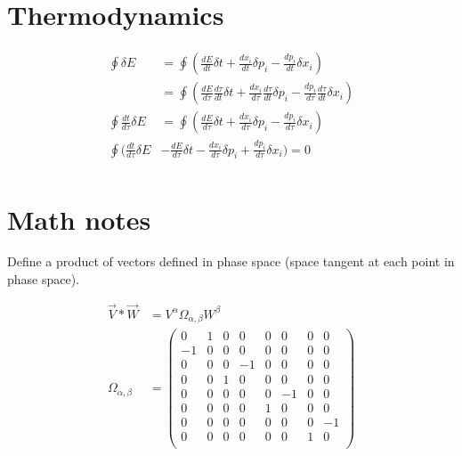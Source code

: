 \documentclass[twocolumn,floatfix,nofootinbib]{revtex4}   %
\theoremstyle{theorem}
\theoremstyle{definition}
\begin{document}
\section{Thermodynamics}
\begin{align*}
\oint \delta E &= \oint (\frac{dE}{dt} \delta t + \frac{dx_i}{dt} \delta p_i - \frac{dp_i}{dt} \delta x_i) \\
 &= \oint (\frac{dE}{d\tau} \frac{d\tau}{dt} \delta t + \frac{dx_i}{d\tau}\frac{d\tau}{dt} \delta p_i - \frac{dp_i}{d\tau}\frac{d\tau}{dt} \delta x_i) \\
\oint \frac{dt}{d\tau} \delta E &= \oint (\frac{dE}{d\tau} \delta t + \frac{dx_i}{d\tau} \delta p_i - \frac{dp_i}{d\tau} \delta x_i) \\
\oint (\frac{dt}{d\tau} \delta E &- \frac{dE}{d\tau} \delta t - \frac{dx_i}{d\tau} \delta p_i + \frac{dp_i}{d\tau} \delta x_i) = 0 \\
\end{align*}


\section{Math notes}

Define a product of vectors defined in phase space (space tangent at each point in phase space).

\begin{align*}
\vec{V} \ast \vec{W} &= V^{\alpha} \Omega_{\alpha, \beta} W^{\beta} \\
\Omega_{\alpha, \beta} &= \left(
                      \begin{array}{cccccccc}
                        0 & 1 & 0 & 0 & 0 & 0 & 0 & 0 \\
                        -1 & 0 & 0 & 0 & 0 & 0 & 0 & 0 \\
                        0 & 0 & 0 & -1 & 0 & 0 & 0 & 0 \\
                        0 & 0 & 1 & 0 & 0 & 0 & 0 & 0 \\
                        0 & 0 & 0 & 0 & 0 & -1 & 0 & 0 \\
                        0 & 0 & 0 & 0 & 1 & 0 & 0 & 0 \\
                        0 & 0 & 0 & 0 & 0 & 0 & 0 & -1 \\
                        0 & 0 & 0 & 0 & 0 & 0 & 1 & 0 \\
                      \end{array}
                    \right) \\
\end{align*}
\end{document}
